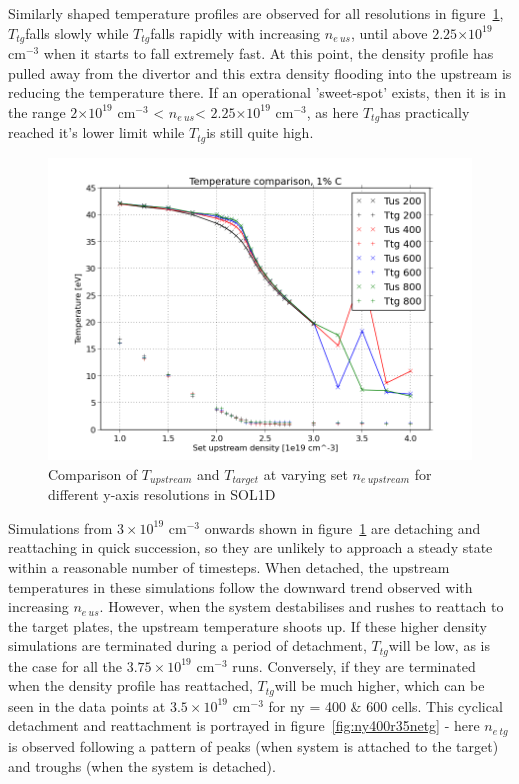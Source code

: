 \documentclass[11pt, twocolumn]{article}  %
\providecommand{\e}[1]{\ensuremath{\times 10^{#1}}} %
\providecommand{\noNe}[1]{{${#1}\times 10^{19}$ cm$^{-3}$}} %
\providecommand{\neus}{$n_{e~us}$} %
\providecommand{\netg}{$n_{e~tg}$} %
\providecommand{\Tus}{$T_{tg}$} %
\providecommand{\Ttg}{$T_{tg}$} %
\begin{document}
Similarly shaped temperature profiles are observed for all resolutions in figure~\ref{fig:TT_IMPCOMBO2}, \Tus falls slowly while \Ttg falls rapidly with increasing \neus, until above $2.25\e{19}$ cm$^{-3}$ when it starts to fall extremely fast. At this point, the density profile has pulled away from the divertor and this extra density flooding into the upstream is reducing the temperature there. If an operational 'sweet-spot' exists, then it is in the range $2\e{19}$ cm$^{-3}$ < \neus < $2.25\e{19}$ cm$^{-3}$, as here \Ttg has practically reached it's lower limit while \Tus is still quite high.

\begin{figure}
\includegraphics[scale=0.5]{Figures/sol1d/TT_IMPCOMBO2.png}
\centering
\caption{Comparison of $T_{upstream}$ and $T_{target}$ at varying set $n_{e~upstream}$ for different y-axis resolutions in SOL1D}\label{fig:TT_IMPCOMBO2}
\end{figure}

Simulations from \noNe{3} onwards shown in figure~\ref{fig:TT_IMPCOMBO2} are detaching and reattaching in quick succession, so they are unlikely to approach a steady state within a reasonable number of timesteps. When detached, the upstream temperatures in these simulations follow the downward trend observed with increasing \neus. However, when the system destabilises and rushes to reattach to the target plates, the upstream temperature shoots up. If these higher density simulations are terminated during a period of detachment, \Tus will be low, as is the case for all the \noNe{3.75} runs. Conversely, if they are terminated when the density profile has reattached, \Tus will be much higher, which can be seen in the data points at \noNe{3.5} for ny = 400 \& 600 cells. This cyclical detachment and reattachment is portrayed in figure~\ref{fig:ny400r35netg} - here \netg is observed following a pattern of peaks (when system is attached to the target) and troughs (when the system is detached).
\end{document}
